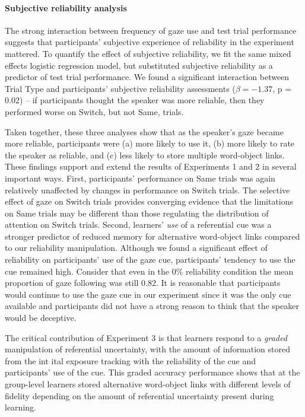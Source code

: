 \documentclass[authoryear, review]{elsarticle}
\begin{document}
\paragraph{Subjective reliability
analysis}\label{subjective-reliability-analysis}

The strong interaction between frequency of gaze use and test trial
performance suggests that participants' subjective experience of
reliability in the experiment mattered. To quantify the effect of
subjective reliability, we fit the same mixed effects logistic
regression model, but substituted subjective reliability as a predictor
of test trial performance. We found a significant interaction between
Trial Type and participants' subjective reliability assessments
(\(\beta = -1.37\), p = 0.02) -- if participants thought the speaker was
more reliable, then they performed worse on Switch, but not Same,
trials.

Taken together, these three analyses show that as the speaker's gaze
became more reliable, participants were (a) more likely to use it, (b)
more likely to rate the speaker as reliable, and (c) less likely to
store multiple word-object links. These findings support and extend the
results of Experiments 1 and 2 in several important ways. First,
participants' performance on Same trials was again relatively unaffected
by changes in performance on Switch trials. The selective effect of gaze
on Switch trials provides converging evidence that the limitations on
Same trials may be different than those regulating the distribution of
attention on Switch trials. Second, learners' \emph{use} of a
referential cue was a stronger predictor of reduced memory for
alternative word-object links compared to our reliability manipulation.
Although we found a significant effect of reliability on participants'
use of the gaze cue, participants' tendency to use the cue remained
high. Consider that even in the 0\% reliability condition the mean
proportion of gaze following was still 0.82. It is reasonable that
participants would continue to use the gaze cue in our experiment since
it was the only cue available and participants did not have a strong
reason to think that the speaker would be deceptive.

The critical contribution of Experiment 3 is that learners respond to a
\emph{graded} manipulation of referential uncertainty, with the amount
of information stored from the int ital exposure tracking with the
reliability of the cue and participants' use of the cue. This graded
accuracy performance shows that at the group-level learners stored
alternative word-object links with different levels of fidelity
depending on the amount of referential uncertainty present during
learning.
\end{document}

